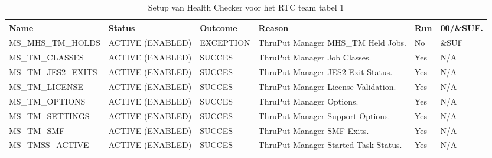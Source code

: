 \begin{landscape}
	\begin{table}[h]
		\begin{tabular}{|l|p{2.3cm}|l|p{4.5cm}|l|l|}
			\hline
			\textbf{Name}                       & \textbf{Status}   & \textbf{Outcome} & \textbf{Reason}    & \textbf{Run} &	\textbf{00/\&SUF.} \\ \hline
			MS\_MHS\_TM\_HOLDS  & ACTIVE (ENABLED) & EXCEPTION & ThruPut Manager MHS\_TM Held Jobs.     & No  & \&SUF \\ \hline
			MS\_TM\_CLASSES     & ACTIVE (ENABLED) & SUCCES    & ThruPut   Manager Job Classes.         & Yes & N/A   \\ \hline
			MS\_TM\_JES2\_EXITS & ACTIVE (ENABLED) & SUCCES    & ThruPut   Manager JES2 Exit Status.    & Yes & N/A   \\ \hline
			MS\_TM\_LICENSE     & ACTIVE (ENABLED) & SUCCES    & ThruPut   Manager License Validation.  & Yes & N/A   \\ \hline
			MS\_TM\_OPTIONS     & ACTIVE (ENABLED) & SUCCES    & ThruPut   Manager Options.             & Yes & N/A   \\ \hline
			MS\_TM\_SETTINGS    & ACTIVE (ENABLED) & SUCCES    & ThruPut   Manager Support Options.     & Yes & N/A   \\ \hline
			MS\_TM\_SMF         & ACTIVE (ENABLED) & SUCCES    & ThruPut   Manager SMF Exits.           & Yes & N/A   \\ \hline
			MS\_TMSS\_ACTIVE    & ACTIVE (ENABLED) & SUCCES    & ThruPut   Manager Started Task Status. & Yes & N/A   \\ \hline
		\end{tabular}
		\caption[Health Checker RTC team tabel 1]{Setup van Health Checker voor het RTC team tabel 1}
		\label{tbl:RTC Team Tabel 1}
	\end{table}
\end{landscape}

